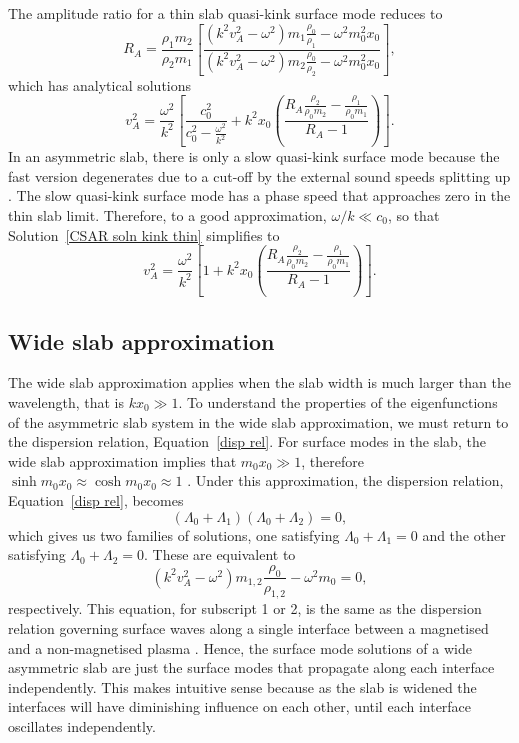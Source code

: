 \documentclass[namedreferences]{solarphysics}
\numberwithin{equation}{section}
\begin{document}
\begin{article}
The amplitude ratio for a thin slab quasi-kink surface mode reduces to
\begin{equation}
R_A = \frac{\rho_1m_2}{\rho_2m_1}\left[\frac{(k^2v_A^2-\omega^2)m_1\frac{\rho_0}{\rho_1}-\omega^2m_0^2x_0}{(k^2v_A^2-\omega^2)m_2\frac{\rho_0}{\rho_2}-\omega^2m_0^2x_0}\right], 
\end{equation}
which has analytical solutions
\begin{equation}
v_A^2 = \frac{\omega^2}{k^2} \left[\frac{c_0^2}{c_0^2 - \frac{\omega^2}{k^2}} + k^2x_0\left(\frac{R_A\frac{\rho_2}{\rho_0m_2} - \frac{\rho_1}{\rho_0m_1}}{R_A - 1}\right)\right]. \label{CSAR soln kink thin}
\end{equation}
In an asymmetric slab, there is only a slow quasi-kink surface mode because the fast version degenerates due to a cut-off by the external sound speeds splitting up \citep{all_etal17}. The slow quasi-kink surface mode has a phase speed that approaches zero in the thin slab limit. Therefore, to a good approximation, $\omega/k \ll c_0$, so that Solution~\eqref{CSAR soln kink thin} simplifies to
\begin{equation}
v_A^2 = \frac{\omega^2}{k^2} \left[1 + k^2x_0\left(\frac{R_A\frac{\rho_2}{\rho_0m_2} - \frac{\rho_1}{\rho_0m_1}}{R_A - 1}\right)\right]. \label{CSAR soln kink thin simplified}
\end{equation}

\subsection{Wide slab approximation} \label{sec: CSAR wide slab}
The wide slab approximation applies when the slab width is much larger than the wavelength, that is $kx_0 \gg 1$. To understand the properties of the eigenfunctions of the asymmetric slab system in the wide slab approximation, we must return to the dispersion relation, Equation~\eqref{disp rel}. For surface modes in the slab, the wide slab approximation implies that $m_0x_0 \gg 1$, therefore ${\sinh{m_0x_0} \approx \cosh{m_0x_0} \approx 1}$ \citep{rob81b}. Under this approximation, the dispersion relation, Equation~\eqref{disp rel}, becomes
\begin{equation}
(\Lambda_0 + \Lambda_1)(\Lambda_0 + \Lambda_2) = 0,
\end{equation}
which gives us two families of solutions, one satisfying $\Lambda_0 + \Lambda_1 = 0$ and the other satisfying $\Lambda_0 + \Lambda_2 = 0$. These are equivalent to
\begin{equation}
(k^2v_A^2 - \omega^2)m_{1,2}\frac{\rho_0}{\rho_{1,2}} - \omega^2m_0 = 0,
\end{equation}
respectively. This equation, for subscript 1 or 2, is the same as the dispersion relation governing surface waves along a single interface between a magnetised and a non-magnetised plasma \citep{rob81a}. Hence, the surface mode solutions of a wide asymmetric slab are just the surface modes that propagate along each interface independently. This makes intuitive sense because as the slab is widened the interfaces will have diminishing influence on each other, until each interface oscillates independently.


\end{article}
\end{document}
